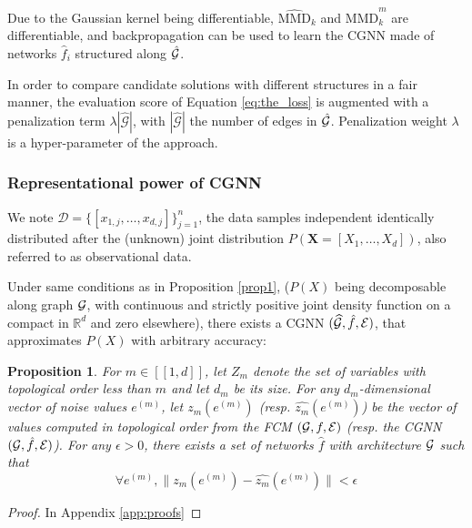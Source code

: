 \documentclass[a4paper, 11pt]{article}
\newtheorem{prop}{Proposition}
\begin{document}
Due to the Gaussian kernel being differentiable, $\widehat{\text{MMD}}_k$ and $\widehat{\text{MMD}}_k^m$ are differentiable, and backpropagation can be used to learn the CGNN made of networks $\hat {f}_i$ structured along $\hat{\cal G}$. 



In order to compare candidate solutions with different structures in a fair manner, the evaluation score of Equation \ref{eq:the_loss} is augmented with a penalization term $\lambda |\widehat{\mathcal{G}}|$, 
with $|\widehat{\mathcal{G}}|$ the number of edges in $\hat{\cal G}$. Penalization weight $\lambda$ is a hyper-parameter of the approach. 


\subsubsection{Representational power of CGNN \label{Approx}} 

 We note  $\mathcal{D} = \{ [x_{1,j}, \ldots, x_{d,j}]\}_{j=1}^{n}$, the data samples independent  identically distributed after the (unknown) joint  distribution $P({\mathbf X} = [X_1,
\ldots, X_d])$, also referred to as observational data.

Under same conditions as in Proposition \ref{prop1}, ($P(X)$ being decomposable along graph $\cal G$, with continuous and strictly positive joint density function on a compact in $\mathbb{R}^d$ and zero elsewhere), there exists a CGNN $(\widehat{\mathcal {G}}, \hat{f}, {\cal E})$, that approximates $P(X)$ with arbitrary accuracy:

 \begin{prop}{\label{prop2}}
For $m \in [[1,d]]$, let $Z_m$ denote the set of variables with topological order less than $m$ and let $d_m$ be its size. For any $d_m$-dimensional vector of noise values $e^{(m)}$, let $z_m(e^{(m)})$ (resp. $\widehat{z_m}(e^{(m)})$) be the vector of values computed in topological order from the FCM $({\cal G}, f, {\cal E})$ (resp. the CGNN $({\cal G}, \hat{f}, {\cal E})$). 
For any $\epsilon > 0$, there exists a set of networks $\hat{f}$ with architecture $\cal G$ such that 
\begin{equation}
\forall e^{(m)},  \|z_m(e^{(m)})- \widehat{z_m}(e^{(m)})\| < \epsilon
\label{eq:prop2}
\end{equation}
\end{prop}
\begin{proof}
In Appendix \ref{app:proofs}
\end{proof}
\end{document}
